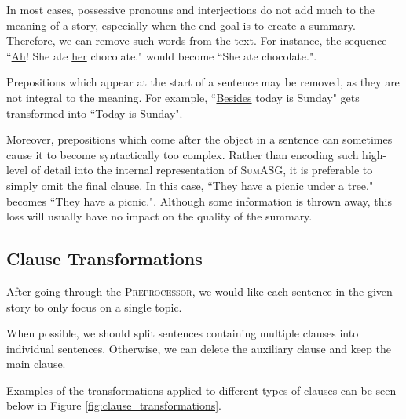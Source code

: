 In most cases, possessive pronouns and interjections do not add much to the meaning of a story, especially when the end goal is to create a summary. Therefore, we can remove such words from the text. For instance, the sequence ``\underline{Ah}! She ate \underline{her} chocolate." would become ``She ate chocolate.".

Prepositions which appear at the start of a sentence may be removed, as they are not integral to the meaning. For example, ``\underline{Besides} today is Sunday" gets transformed into ``Today is Sunday".

Moreover, prepositions which come after the object in a sentence can sometimes cause it to become syntactically too complex. Rather than encoding such high-level of detail into the internal representation of \textsc{SumASG}, it is preferable to simply omit the final clause. In this case, ``They have a picnic \underline{under} a tree." becomes ``They have a picnic.". Although some information is thrown away, this loss will usually have no impact on the quality of the summary.

\subsection{Clause Transformations}

After going through the \textsc{Preprocessor}, we would like each sentence in the given story to only focus on a single topic.

When possible, we should split sentences containing multiple clauses into individual sentences. Otherwise, we can delete the auxiliary clause and keep the main clause.

Examples of the transformations applied to different types of clauses can be seen below in Figure \ref{fig:clause_transformations}.

